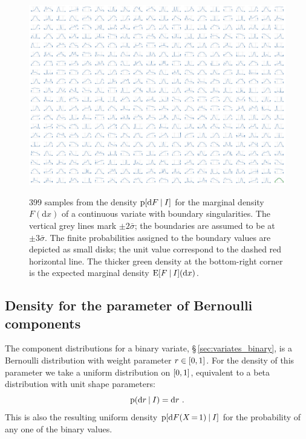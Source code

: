 \documentclass[\ifafour a4paper,12pt,\else a5paper,10pt,\fi%
onecolumn,oneside,article,%
british%
]{memoir}
\theoremstyle{remark}
\theoremstyle{innote}
\newcommand*{\di}{\mathrm{d}}%
\DeclarePairedDelimiter\clcl{[}{]}
\newcommand*{\p}{\mathrm{p}}%
\newcommand*{\E}{\mathrm{E}}
\renewcommand*{\|}[1][]{\nonscript\:#1\vert\nonscript\:\mathopen{}}
\newcommand*{\mo}[1][=]{\mathord{\,#1\,}}
\newcommand*{\sect}{\S}%
\newcommand*{\sigmao}{\bar{\sigma}}
\begin{document}
\begin{figure}
\centering\includegraphics[width=\linewidth]{priorsamples_2censored.pdf}\\
\caption{399 samples from the density $\p[\di F \| I]$ for the marginal density $F(\di x)$ of a continuous variate with boundary singularities. The vertical grey lines mark $\pm 2\sigmao$; the boundaries are assumed to be at $\pm 3\sigmao$. The finite probabilities assigned to the boundary values are depicted as small disks; the unit value correspond to the dashed red horizontal line. The thicker green density at the bottom-right corner is the expected marginal density $\E[F\| I](\di x)$.}\label{fig:marginal_real}
\end{figure}

\subsection{Density for the parameter of Bernoulli components}
\label{sec:density_bernoulli}

The component distributions for a binary variate, \sect\,\ref{sec:variates_binary}, is a Bernoulli distribution with weight parameter $r \in\clcl{0,1}$. For the density of this parameter we take a uniform distribution on $\clcl{0,1}$, equivalent to a beta distribution with unit shape parameters:
\begin{equation}
  \label{eq:density_q_bernoulli}
  \p(\di r\|I) = \di r \ .
\end{equation}
This is also the resulting uniform density $\p[\di F(X \mo 1) \|I]$ for the probability of any one of the binary values.
\end{document}
